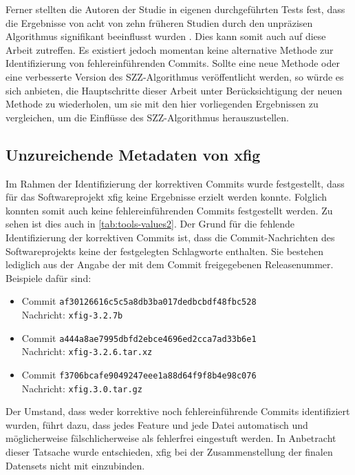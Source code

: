 Ferner stellten die Autoren der Studie in eigenen durchgeführten Tests fest, dass die Ergebnisse von acht von zehn früheren Studien durch den unpräzisen Algorithmus signifikant beeinflusst wurden \cite{Wen2019}. Dies kann somit auch auf diese Arbeit zutreffen. Es existiert jedoch momentan keine alternative Methode zur Identifizierung von fehlereinführenden Commits. Sollte eine neue Methode oder eine verbesserte Version des SZZ-Algorithmus veröffentlicht werden, so würde es sich anbieten, die Hauptschritte dieser Arbeit unter Berücksichtigung der neuen Methode zu wiederholen, um sie mit den hier vorliegenden Ergebnissen zu vergleichen, um die Einflüsse des SZZ-Algorithmus herauszustellen.

\subsection*{Unzureichende Metadaten von xfig}
\label{xfig}
Im Rahmen der Identifizierung der korrektiven Commits wurde festgestellt, dass für das Softwareprojekt xfig keine Ergebnisse erzielt werden konnte. Folglich konnten somit auch keine fehlereinführenden Commits festgestellt werden. Zu sehen ist dies auch in \autoref{tab:tools-values2}. Der Grund für die fehlende Identifizierung der korrektiven Commits ist, dass die Commit-Nachrichten des Softwareprojekts keine der festgelegten Schlagworte enthalten. Sie bestehen lediglich aus der Angabe der mit dem Commit freigegebenen Releasenummer. Beispiele dafür sind:

\begin{itemize}
\setlength{\itemsep}{-2pt}
\item Commit \texttt{af30126616c5c5a8db3ba017dedbcbdf48fbc528}\\Nachricht: \texttt{xfig-3.2.7b}
\item Commit \texttt{a444a8ae7995dbfd2ebce4696ed2cca7ad33b6e1}\\Nachricht: \texttt{xfig-3.2.6.tar.xz}
\item Commit \texttt{f3706bcafe9049247eee1a88d64f9f8b4e98c076}\\Nachricht: \texttt{xfig.3.0.tar.gz}
\end{itemize}

Der Umstand, dass weder korrektive noch fehlereinführende Commits identifiziert wurden, führt dazu, dass jedes Feature und jede Datei automatisch und möglicherweise fälschlicherweise als \glqq fehlerfrei\grqq{} eingestuft werden. In Anbetracht dieser Tatsache wurde entschieden, xfig bei der Zusammenstellung der finalen Datensets nicht mit einzubinden.

